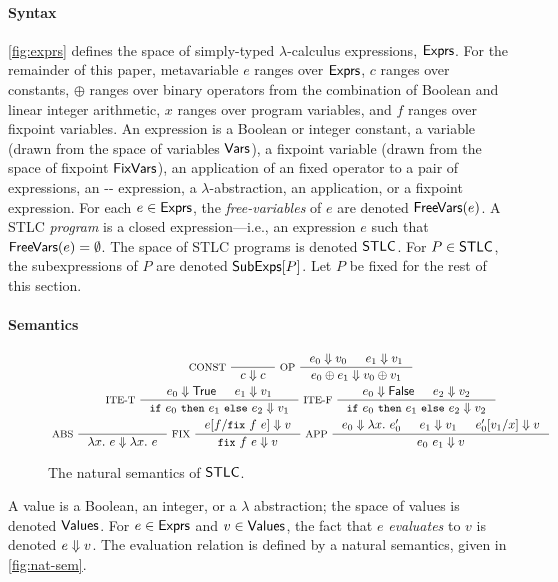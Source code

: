\paragraph{Syntax} \autoref{fig:exprs} defines the space of
simply-typed $\lambda$-calculus expressions, $\mathsf{Exprs}$.
%
For the remainder of this paper, metavariable $e$ ranges over
$\mathsf{Exprs}$, %
$c$ ranges over constants, %
$\oplus$ ranges over binary operators from the combination of Boolean
and linear integer arithmetic, %
$x$ ranges over program variables, and %
$f$ ranges over fixpoint variables.
%
An expression is a Boolean or integer constant, %
a variable (drawn from the space of variables $\mathsf{Vars}$), %
a fixpoint variable (drawn from the space of fixpoint $\mathsf{FixVars}$), %
an application of an fixed operator to a pair of expressions, %
an -- expression, %
a $\lambda$-abstraction, %
an application, or %
a fixpoint expression.
%
For each $e \in \mathsf{Exprs}$, the \emph{free-variables} of $e$ are denoted
$\mathsf{FreeVars}(e)$.
%
A STLC \emph{program} is a closed expression---i.e., an expression $e$
such that $\mathsf{FreeVars}(e) = \emptyset$.
%
The space of STLC programs is denoted $\mathsf{STLC}$.
%
For $P \in \mathsf{STLC}$, the subexpressions of $P$ are denoted
$\mathsf{SubExps}[  P  ]$.
%
Let $P$ be fixed for the rest of this section.

\paragraph{Semantics}
%
\begin{figure}
  \centering
  \begin{gather*}
  \inference[ CONST ]{ }{ c \evalsto c }
  \inference[ OP ]{ %
    e_0 \evalsto v_0 & %
    e_1 \evalsto v_1 } %
  { e_0 \oplus e_1 \evalsto v_0 \oplus v_1 } \\
  \inference[ ITE-T ]{ %
    e_0 \evalsto \true & %
    e_1 \evalsto v_1 } %
  { \ite{ e_0 }{ e_1 }{ e_2 } \evalsto v_1 }
  \inference[ ITE-F ]{ %
    e_0 \evalsto \false & %
    e_2 \evalsto v_2 } %
  { \ite{ e_0 }{ e_1 }{ e_2 } \evalsto v_2 } \\
  \inference[ ABS ]{ } %
  { \lambda x.\ e \evalsto \lambda x.\ e }
  \inference[ FIX ]{ \replace{e}{ \fix{ f }{ e } }{ f } \evalsto v } %
  { \fix{ f }{ e } \evalsto v }
  \inference[ APP ]{ %
    e_0 \evalsto \lambda x.\ e_0' & %
    e_1 \evalsto v_1 & %
    \replace{ e_0' }{ x }{ v_1 } \evalsto v }
  { e_0\ e_1 \evalsto v } 
  \end{gather*}
  \caption{The natural semantics of $\mathsf{STLC}$.}
  \label{fig:nat-sem}
\end{figure}
%
A value is a Boolean, an integer, or a $\lambda$ abstraction;
%
the space of values is denoted $\mathsf{Values}$.
%
For $e \in \mathsf{Exprs}$ and $v \in \mathsf{Values}$, the fact that $e$
\emph{evaluates} to $v$ is denoted $e \Downarrow v$.
% 
The evaluation relation is defined by a natural semantics, given in
\autoref{fig:nat-sem}.

